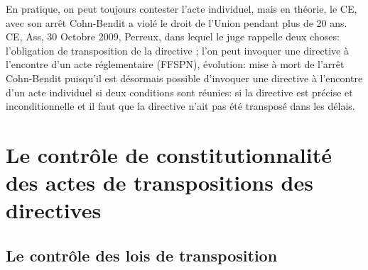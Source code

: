 \documentclass[10pt, a4paper, openany]{book}
\begin{document}
En pratique, on peut toujours contester l'acte individuel, mais en théorie, le CE, avec son arrêt Cohn-Bendit a violé le droit de l'Union pendant plus de 20 ans. \\
CE, Ass, 30 Octobre 2009, Perreux, dans lequel le juge rappelle deux choses: l'obligation de transposition de la directive ; l'on peut invoquer une directive à l'encontre d'un acte réglementaire (FFSPN), évolution: mise à mort de l'arrêt Cohn-Bendit puisqu'il est désormais possible d'invoquer une directive à l'encontre d'un acte individuel si deux conditions sont réunies: si la directive est précise et inconditionnelle et il faut que la directive n'ait pas été transposé dans les délais. 

\section{Le contrôle de constitutionnalité des actes de transpositions des directives}

\subsection{Le contrôle des lois de transposition}
\end{document}
